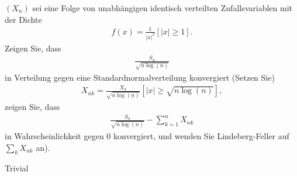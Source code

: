 \begin{exercise}
$(X_n)$ sei eine Folge von unabhängigen identisch verteilten Zufallsvariablen mit
der Dichte
\begin{align*}
  f(x) = \frac{1}{|x|^3}[|x| \geq 1].
\end{align*}
Zeigen Sie, dass
\begin{align*}
  \frac{S_n}{\sqrt{n\log(n)}}
\end{align*}
in Verteilung gegen eine Standardnormalverteilung konvergiert (Setzen Sie)
\begin{align*}
  X_{nk} = \frac{X_k}{\sqrt{n\log(n)}}[|x| \geq \sqrt{n\log(n)}],
\end{align*}
zeigen Sie, dass
\begin{align*}
  \frac{S_n}{\sqrt{n\log(n)}} - \sum_{k=1}^nX_{nk}
\end{align*}
in Wahrscheinlichkeit gegen 0 konvergiert, und wenden Sie Lindeberg-Feller auf
$\sum_k X_{nk}$ an).
\end{exercise}

\begin{solution}

Trivial

\end{solution}
